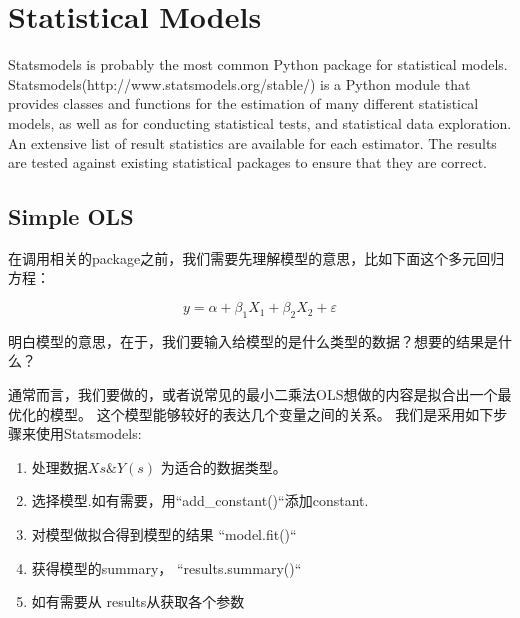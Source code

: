 \documentclass[11pt,fleqn]{book} %
\begin{document}
%

\section{Statistical Models}
Statsmodels is probably the most common Python package for statistical models.
Statsmodels(http://www.statsmodels.org/stable/) is a Python module that provides classes and functions for the estimation of many different statistical models,
as well as for conducting statistical tests,
and statistical data exploration.
An extensive list of result statistics are available for each estimator.
The results are tested against existing statistical packages to ensure that they are correct. 

\subsection{Simple OLS}
在调用相关的package之前，我们需要先理解模型的意思，比如下面这个多元回归方程：

\[
y = \alpha + \beta_1X_1 + \beta_2X_2 + \varepsilon
\]

明白模型的意思，在于，我们要输入给模型的是什么类型的数据？想要的结果是什么？

通常而言，我们要做的，或者说常见的最小二乘法OLS想做的内容是拟合出一个最优化的模型。
这个模型能够较好的表达几个变量之间的关系。
我们是采用如下步骤来使用Statsmodels:
\begin{enumerate}
\item 处理数据$Xs \& Y(s)$ 为适合的数据类型。
\item 选择模型.如有需要，用``add\_constant()``添加constant.
\item 对模型做拟合得到模型的结果 ``model.fit()``
\item 获得模型的summary， ``results.summary()``
\item 如有需要从 results从获取各个参数
\end{enumerate}
\end{document}
